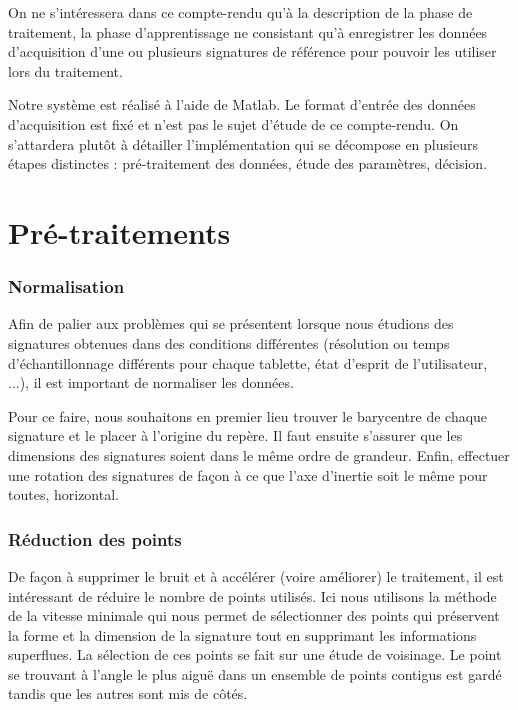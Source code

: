 \documentclass[fontsize=12pt, twoside=no]{scrartcl} %
\begin{document}
On ne s'intéressera dans ce compte-rendu qu'à la description de la phase de traitement, la phase d'apprentissage ne consistant qu'à enregistrer les données d'acquisition d'une ou plusieurs signatures de référence pour pouvoir les utiliser lors du traitement.

Notre système est réalisé à l'aide de Matlab. Le format d'entrée des données d'acquisition est fixé et n'est pas le sujet d'étude de ce compte-rendu. On s'attardera plutôt à détailler l'implémentation qui se décompose en plusieurs étapes distinctes : pré-traitement des données, étude des paramètres, décision.

\part{Pré-traitements}

\section{Normalisation}

Afin de palier aux problèmes qui se présentent lorsque nous étudions des signatures obtenues dans des conditions différentes (résolution ou temps d'échantillonnage différents pour chaque tablette, état d'esprit de l'utilisateur, ...), il est important de normaliser les données.

Pour ce faire, nous souhaitons en premier lieu trouver le barycentre de chaque signature et le placer à l'origine du repère. Il faut ensuite s'assurer que les dimensions des signatures soient dans le même ordre de grandeur. Enfin, effectuer une rotation des signatures de façon à ce que l'axe d'inertie soit le même pour toutes, horizontal.

\section{Réduction des points}

De façon à supprimer le bruit et à accélérer (voire améliorer) le traitement, il est intéressant de réduire le nombre de points utilisés. Ici nous utilisons la méthode de la vitesse minimale qui nous permet de sélectionner des points qui préservent la forme et la dimension de la signature tout en supprimant les informations superflues.
La sélection de ces points se fait sur une étude de voisinage. Le point se trouvant à l'angle le plus aiguë dans un ensemble de points contigus est gardé tandis que les autres sont mis de côtés.
\end{document}
